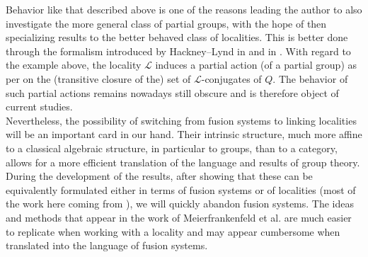 \documentclass{amsart}
\numberwithin{equation}{section}
\theoremstyle{definition}
\theoremstyle{subresult}
\theoremstyle{caseresult}
\renewcommand{\L}{\mathcal{L}}
\newcommand{\<}{\langle}
\renewcommand{\>}{\rangle}
\begin{document}
Behavior like that described above is one of the reasons leading the author to also investigate the more general class of partial groups, with the hope of then specializing results to the better behaved class of localities. This is better done through the formalism introduced by Hackney--Lynd in \cite{Hackney-Lynd:2025} and in \cite{Hackney-Lynd:2025bis}. With regard to the example above, the locality $\L$ induces a partial action (of a partial group) as per \cite[Definition 5.4]{Hackney-Lynd:2025bis} on the (transitive closure of the) set of $\L$-conjugates of $Q$. The behavior of such partial actions remains nowadays still obscure and is therefore object of current studies.\\

Nevertheless, the possibility of switching from fusion systems to linking localities will be an important card in our hand. Their intrinsic structure, much more affine to a classical algebraic structure, in particular to groups, than to a category, allows for a more efficient translation of the language and results of group theory. During the development of the results, after showing that these can be equivalently formulated either in terms of fusion systems or of localities (most of the work here coming from \cite{Henke-Salati:2026}), we will quickly abandon fusion systems.  The ideas and methods that appear in the work of Meierfrankenfeld et al. are much easier to replicate when working with a locality and may appear cumbersome when translated into the language of fusion systems.\\
\end{document}
